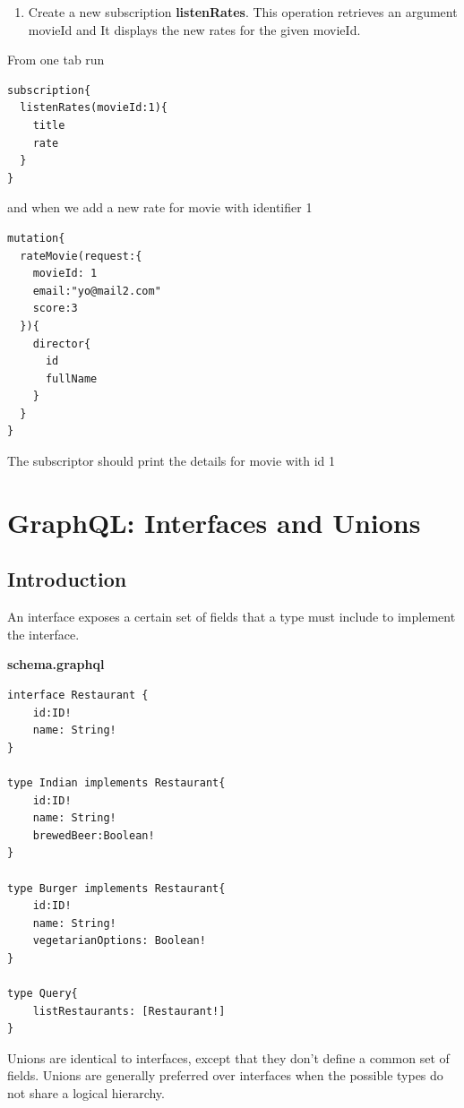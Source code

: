 \documentclass[]{book}
\providecommand{\tightlist}{%
  \setlength{\itemsep}{0pt}\setlength{\parskip}{0pt}}
\begin{document}
\begin{enumerate}
\def\labelenumi{\arabic{enumi}.}
\setcounter{enumi}{4}
\tightlist
\item
  Create a new subscription \textbf{listenRates}. This operation
  retrieves an argument movieId and It displays the new rates for the
  given movieId.
\end{enumerate}

From one tab run

\begin{verbatim}
subscription{
  listenRates(movieId:1){
    title
    rate
  }
}
\end{verbatim}

and when we add a new rate for movie with identifier 1

\begin{verbatim}
mutation{
  rateMovie(request:{
    movieId: 1
    email:"yo@mail2.com"
    score:3
  }){
    director{
      id
      fullName
    }
  }
}
\end{verbatim}

The subscriptor should print the details for movie with id 1

\chapter{GraphQL: Interfaces and
Unions}\label{graphql-interfaces-and-unions}

\section{Introduction}\label{introduction-3}

An interface exposes a certain set of fields that a type must include to
implement the interface.

\textbf{schema.graphql}

\begin{verbatim}
interface Restaurant {
    id:ID!
    name: String!
}

type Indian implements Restaurant{
    id:ID!
    name: String!
    brewedBeer:Boolean!
}

type Burger implements Restaurant{
    id:ID!
    name: String!
    vegetarianOptions: Boolean!
}

type Query{
    listRestaurants: [Restaurant!]
}
\end{verbatim}

Unions are identical to interfaces, except that they don't define a
common set of fields. Unions are generally preferred over interfaces
when the possible types do not share a logical hierarchy.
\end{document}
